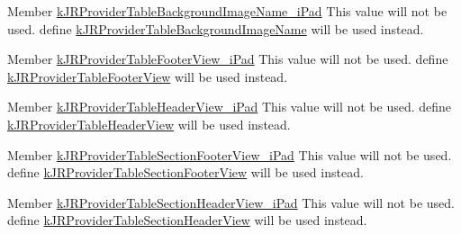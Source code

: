 \label{deprecated__deprecated000009}
\hypertarget{deprecated__deprecated000009}{}
 
\begin{DoxyDescription}
\item[Member \hyperlink{group__custom_interface_ga25b26cff96d8f174f3bdc040031466b7}{kJRProviderTableBackgroundImageName\_\-iPad} ]This value will not be used. define \hyperlink{group__custom_interface_ga893fb6e20be0c6658e81a6a5d5c121f0}{kJRProviderTableBackgroundImageName} will be used instead. 
\end{DoxyDescription}

\label{deprecated__deprecated000015}
\hypertarget{deprecated__deprecated000015}{}
 
\begin{DoxyDescription}
\item[Member \hyperlink{group__custom_interface_gaa23a63165d46433e2ec24ba44ef771da}{kJRProviderTableFooterView\_\-iPad} ]This value will not be used. define \hyperlink{group__custom_interface_ga2b5c9162dd7701a552147ae1607a3b4d}{kJRProviderTableFooterView} will be used instead. 
\end{DoxyDescription}

\label{deprecated__deprecated000014}
\hypertarget{deprecated__deprecated000014}{}
 
\begin{DoxyDescription}
\item[Member \hyperlink{group__custom_interface_gafaf90a1aa537b105ebc2409ceacc652f}{kJRProviderTableHeaderView\_\-iPad} ]This value will not be used. define \hyperlink{group__custom_interface_ga1a0f39bfdb880fdd0b8b39cbec492b6f}{kJRProviderTableHeaderView} will be used instead. 
\end{DoxyDescription}

\label{deprecated__deprecated000017}
\hypertarget{deprecated__deprecated000017}{}
 
\begin{DoxyDescription}
\item[Member \hyperlink{group__custom_interface_gaa2196cc44d4e0dc4de9e98248c8a7e10}{kJRProviderTableSectionFooterView\_\-iPad} ]This value will not be used. define \hyperlink{group__custom_interface_ga984c096e9258dea402a1c27ae8bb6c8f}{kJRProviderTableSectionFooterView} will be used instead. 
\end{DoxyDescription}

\label{deprecated__deprecated000016}
\hypertarget{deprecated__deprecated000016}{}
 
\begin{DoxyDescription}
\item[Member \hyperlink{group__custom_interface_ga7dcb3488390fabe1f3a358fb5af1e42c}{kJRProviderTableSectionHeaderView\_\-iPad} ]This value will not be used. define \hyperlink{group__custom_interface_gaaff8ebdd2b9badb1d0a019a71d47db46}{kJRProviderTableSectionHeaderView} will be used instead. 
\end{DoxyDescription}

